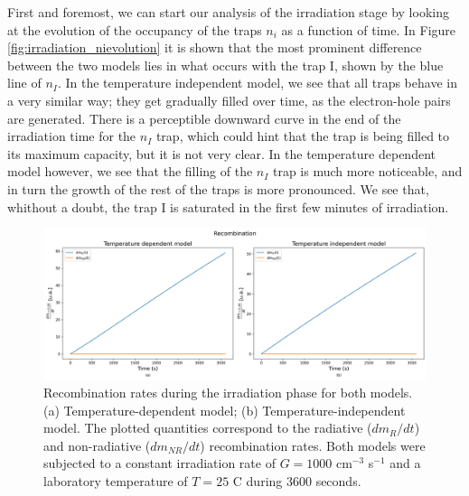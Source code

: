 \vspace{10pt}

First and foremost, we can start our analysis of the irradiation stage by looking at the evolution of the occupancy of the traps $n_i$ as a function of time. In Figure \ref{fig:irradiation_nievolution} it is shown that the most prominent difference between the two models lies in what occurs with the trap I, shown by the blue line of $n_I$. In the temperature independent model, we see that all traps behave in a very similar way; they get gradually filled over time, as the electron-hole pairs are generated. There is a perceptible downward curve in the end of the irradiation time for the $n_I$ trap, which could hint that the trap is being filled to its maximum capacity, but it is not very clear. In the temperature dependent model however, we see that the filling of the $n_I$ trap is much more noticeable, and in turn the growth of the rest of the traps is more pronounced. We see that, whithout a doubt, the trap I is saturated in the first few minutes of irradiation. %

\begin{figure}[ht]
    \centering
    \includegraphics[width=\textwidth]{Images/Irradiation Recombination.png}
    \caption{Recombination rates during the irradiation phase for both models. (a) Temperature-dependent model; (b) Temperature-independent model. The plotted quantities correspond to the radiative ($dm_R/dt$) and non-radiative ($dm_{NR}/dt$) recombination rates. Both models were subjected to a constant irradiation rate of $G = 1000$ cm$^{-3}$ s$^{-1}$ and a laboratory temperature of $T = 25$ \textdegree C during 3600 seconds.}
    \label{fig:irradiation_recombination}
\end{figure}

\vspace{10pt}

